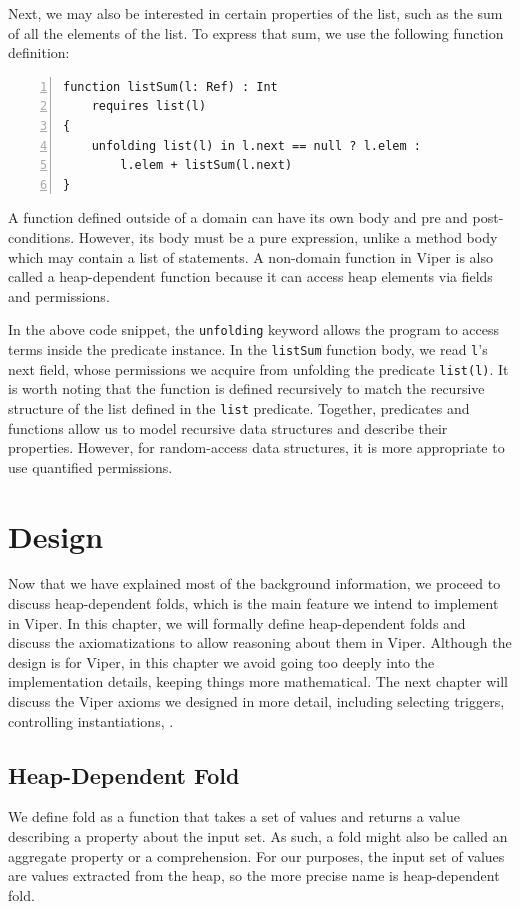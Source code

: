 \documentclass[msc,oneside]{ubcthesis}
\theoremstyle{definition}
\begin{document}
Next, we may also be interested in certain properties of the list, such as the sum of all the elements of the list. To express that sum, we use the following function definition:

\begin{lstlisting}[language=silver,numbers=left, firstnumber=1, stepnumber=1]
function listSum(l: Ref) : Int
    requires list(l)
{
    unfolding list(l) in l.next == null ? l.elem : 
        l.elem + listSum(l.next)
}
\end{lstlisting}

A function defined outside of a domain can have its own body and pre and post-conditions. However, its body must be a pure expression, unlike a method body which may contain a list of statements. A non-domain function in Viper is also called a heap-dependent function because it can access heap elements via fields and permissions.

In the above code snippet, the \lstinline|unfolding| keyword allows the program to access terms inside the predicate instance. In the \lstinline|listSum| function body, we read \lstinline|l|’s next field, whose permissions we acquire from unfolding the predicate \lstinline|list(l)|. It is worth noting that the function is defined recursively to match the recursive structure of the list defined in the \lstinline|list| predicate. Together, predicates and functions allow us to model recursive data structures and describe their properties. However, for random-access data structures, it is more appropriate to use quantified permissions.

\chapter{Design}
Now that we have explained most of the background information, we proceed to discuss heap-dependent folds, which is the main feature we intend to implement in Viper. 
In this chapter, we will formally define heap-dependent folds and discuss the axiomatizations to allow reasoning about them in Viper. Although the design is for Viper, in this chapter we avoid going too deeply into the implementation details, keeping things more mathematical. The next chapter will discuss the Viper axioms we designed in more detail, including selecting triggers, controlling instantiations, \etc.

\section{Heap-Dependent Fold}
We define fold as a function that takes a set of values and returns a value describing a property about the input set. As such, a fold might also be called an aggregate property or a comprehension. For our purposes, the input set of values are values extracted from the heap, so the more precise name is heap-dependent fold.
\end{document}
